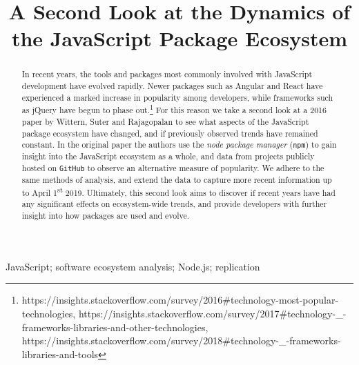 \documentclass[10pt,conference]{IEEEtran}
\def\code#1{\texttt{#1}}
\begin{document}
\title{A Second Look at the Dynamics of the JavaScript Package Ecosystem\\}

\author{
}

\maketitle

\begin{abstract}
In recent years, the tools and packages most commonly involved with JavaScript development have evolved rapidly.
Newer packages such as Angular and React have experienced a marked increase in popularity among developers, while frameworks such as jQuery
have begun to phase out.\footnote{\label{adoption}https://insights.stackoverflow.com/survey/2016\#technology-most-popular-technologies, 
https://insights.stackoverflow.com/survey/2017\#technology-\_-frameworks-libraries-and-other-technologies, 
https://insights.stackoverflow.com/survey/2018\#technology-\_-frameworks-libraries-and-tools}
For this reason we take a second look at a 2016 paper by Wittern, Suter and Rajagopalan \cite{Wittern:2016} 
to see what aspects of the JavaScript package ecosystem have changed, and if previously observed trends have remained constant.
In the original paper the authors use the \emph{node package manager} (\code{npm}) to gain 
insight into the JavaScript ecosystem as a whole, and data from projects publicly hosted on 
\code{GitHub} to observe an alternative measure of popularity. We adhere to the same methods of analysis, 
and extend the data to capture more recent information up to April 1\textsuperscript{st} 2019.
Ultimately, this second look aims to discover if recent years have had any significant effects on 
ecosystem-wide trends, and provide developers with further insight into how packages are used and evolve.
\end{abstract}


\begin{IEEEkeywords}
JavaScript; software ecosystem analysis; Node.js; replication
\end{IEEEkeywords}
\end{document}
